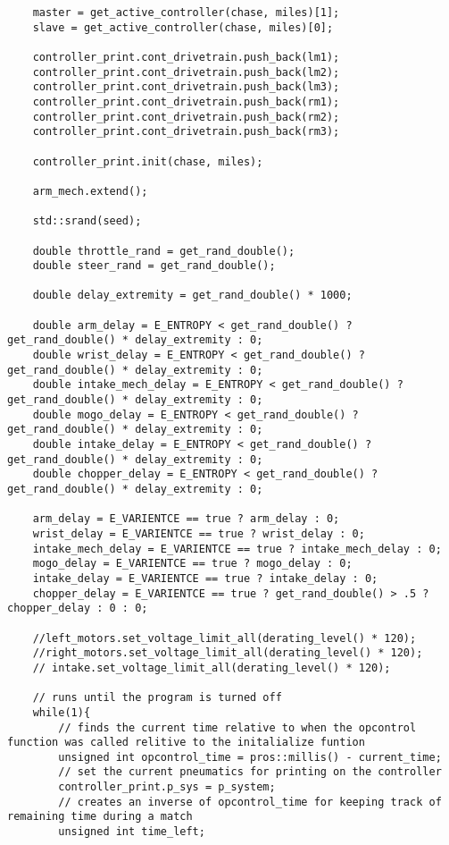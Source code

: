 \begin{verbatim}
    master = get_active_controller(chase, miles)[1];
    slave = get_active_controller(chase, miles)[0];

    controller_print.cont_drivetrain.push_back(lm1);
    controller_print.cont_drivetrain.push_back(lm2);
    controller_print.cont_drivetrain.push_back(lm3);
    controller_print.cont_drivetrain.push_back(rm1);
    controller_print.cont_drivetrain.push_back(rm2);
    controller_print.cont_drivetrain.push_back(rm3);

    controller_print.init(chase, miles);

    arm_mech.extend();

    std::srand(seed);

    double throttle_rand = get_rand_double();
    double steer_rand = get_rand_double();

    double delay_extremity = get_rand_double() * 1000;

    double arm_delay = E_ENTROPY < get_rand_double() ? get_rand_double() * delay_extremity : 0;
    double wrist_delay = E_ENTROPY < get_rand_double() ? get_rand_double() * delay_extremity : 0;
    double intake_mech_delay = E_ENTROPY < get_rand_double() ? get_rand_double() * delay_extremity : 0;
    double mogo_delay = E_ENTROPY < get_rand_double() ? get_rand_double() * delay_extremity : 0;
    double intake_delay = E_ENTROPY < get_rand_double() ? get_rand_double() * delay_extremity : 0;
    double chopper_delay = E_ENTROPY < get_rand_double() ? get_rand_double() * delay_extremity : 0;

    arm_delay = E_VARIENTCE == true ? arm_delay : 0;
    wrist_delay = E_VARIENTCE == true ? wrist_delay : 0;
    intake_mech_delay = E_VARIENTCE == true ? intake_mech_delay : 0;
    mogo_delay = E_VARIENTCE == true ? mogo_delay : 0;
    intake_delay = E_VARIENTCE == true ? intake_delay : 0;
    chopper_delay = E_VARIENTCE == true ? get_rand_double() > .5 ? chopper_delay : 0 : 0;

    //left_motors.set_voltage_limit_all(derating_level() * 120);
    //right_motors.set_voltage_limit_all(derating_level() * 120);
    // intake.set_voltage_limit_all(derating_level() * 120);

    // runs until the program is turned off
	while(1){
        // finds the current time relative to when the opcontrol function was called relitive to the initalialize funtion
        unsigned int opcontrol_time = pros::millis() - current_time;
        // set the current pneumatics for printing on the controller
        controller_print.p_sys = p_system;
        // creates an inverse of opcontrol_time for keeping track of remaining time during a match
        unsigned int time_left;


\end{verbatim}
